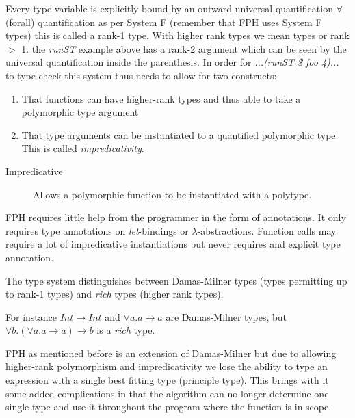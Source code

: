 Every type variable is explicitly bound by an outward universal quantification $\forall$ (forall) quantification as per System F (remember that FPH uses System F types) this is called a rank-1 type. With higher rank types we mean types or rank $>$ 1.
the \textit{runST} example above has a rank-2 argument which can be seen by the universal quantification inside the parenthesis.
In order for \textit{...(runST \$ foo 4)...} to type check this system thus needs to allow for two constructs:
\begin{enumerate}
\item That functions can have higher-rank types and thus able to take a polymorphic type argument
\item That type arguments can be instantiated to a quantified polymorphic type. This is called \textit{impredicativity}.
\end{enumerate}

\begin{description}
\item[Impredicative] Allows a polymorphic function to be instantiated with a polytype. 
\end{description}

FPH requires little help from the programmer in the form of annotations. It only requires type annotations on \textit{let}-bindings or $\lambda$-abstractions. Function calls may require a lot of impredicative instantiations but never requires and explicit type annotation.

The type system distinguishes between Damas-Milner types (types permitting up to rank-1 types) and \textit{rich} types (higher rank types).


For instance $Int \rightarrow Int$ and $\forall a. a \rightarrow a$ are Damas-Milner types, but $\forall b.(\forall a. a \rightarrow a) \rightarrow b$ is a \textit{rich} type.

FPH as mentioned before is an extension of Damas-Milner but due to allowing higher-rank polymorphism and impredicativity we lose the ability to type an expression with a single best fitting type (principle type). This brings with it some added complications in that the algorithm can no longer determine one single type and use it throughout the program where the function is in scope.

